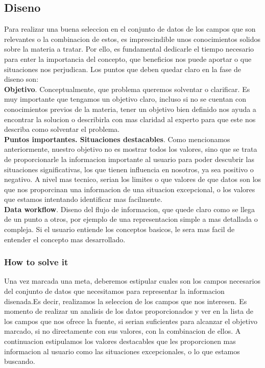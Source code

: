 \subsection{Diseno}
Para realizar una buena seleccion en el conjunto de datos de los campos que son relevantes o la combinacion de estos, es imprescindible unos 
conocimientos solidos sobre la materia a tratar. Por ello, es fundamental dedicarle el tiempo necesario para enter la
importancia del concepto, que beneficios nos puede aportar o que situaciones nos perjudican.
Los puntos que deben quedar claro en la fase de diseno son:\\

 \textbf{Objetivo}. Conceptualmente, que problema queremos solventar o clarificar. Es muy importante que tengamos un objetivo claro,
    incluso si no se cuentan con conocimientos previos de la materia, tener un objetivo bien definido nos ayuda a encontrar la solucion o 
    describirla con mas claridad al experto para que este nos describa como solventar el problema.\\

 \textbf{Puntos importantes. Situaciones destacables}. Como mencionamos anteriormente, nuestro objetivo no es mostrar todos los valores, sino
    que se trata de proporcionarle la informacion importante al usuario para poder descubrir las situaciones significativas, los que tienen influencia en
    nosotros, ya sea positivo o negativo. A nivel mas tecnico, serian los limites o que valores de que datos son los que nos proporcinan una informacion
    de una situacion excepcional, o los valores que estamos intentando identificar mas facilmente.\\

 \textbf{Data workflow}. Diseno del flujo de informacion, que quede claro como se llega de un punto a otros, por ejemplo de una representacion
    simple a mas detallada o compleja. Si el usuario entiende los conceptos basicos, le sera mas facil de entender el concepto mas desarrollado.

\subsubsection{How to solve it} 
Una vez marcada una meta, deberemos estipular cuales son los campos necesarios del conjunto de datos que necesitamos para representar la informacion
disenada.Es decir, realizamos la seleccion de los campos que nos interesen. Es momento de realizar un analisis de los datos proporcionados y ver en 
la lista de los campos que nos ofrece la fuente, si serian suficientes para alcanzar el objetivo marcado, si no directamente con sus valores, con la combinacion de ellos.
A continuacion estipulamos los valores destacables que les proporcionen mas informacion al usuario como las situaciones excepcionales, o lo que estamos buscando.

